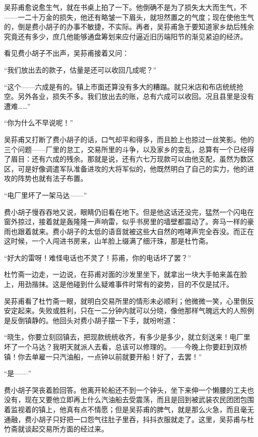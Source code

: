 \par 吴荪甫愈说愈生气，就在书桌上拍了一下。他倒确不是为了损失太大而生气，不——一二十万金的损失，他还有略皱一下眉头，就坦然置之的气度；现在使他生气的，倒是费小胡子的办事不敏捷，不实际。再者，吴荪甫急于要知道家乡劫后残余究竟还有多少，庶几他能够通盘筹划来应付逼近旧历端阳节的渐见紧迫的经济。
\par 看见费小胡子不出声，吴荪甫接着又问：
\par “我们放出去的款子，估量是还可以收回几成呢？”
\par “这个——六成是有的。镇上市面还算没有多大的糟蹋。就只米店和布店统统抢空。另外各业，损失不多。我们放出去的账，总有六成可以收回。况且县里是没有遭难……”
\par “你为什么不早说呢！”
\par 吴荪甫又打断了费小胡子的话，口气却平和得多，而且脸上也掠过一丝笑影。他的三个问题——厂里的怠工，交易所里的斗争，以及家乡的变乱，总算有一个已经得了眉目：还有六成的残余。那就是说，还有六七万现款可以由他支配，虽然为数区区，可是好像调遣军队准备进攻的大将军似的，他既然明白了自己的实力，他的进攻的阵势也就有法子布置。
\par “电厂里坏了一架马达——”
\par 费小胡子慢吞吞地又说，眼睛仍旧看在地下。但是他这话还没完，猛然一个闪电在窗外掠过，接着就是轰隆隆一声响雷，似乎书房里的墙壁都震动了。奔马一样的豪雨也跟着就来。费小胡子的太低的语音就被这些大自然的咆哮声完全吞没。而正在这时候，一个人闯进书房来，山羊脸上缀满了细汗珠，那是杜竹斋。
\par “好大的雷呀！难怪电话也不灵了！荪甫，你的电话坏了罢？”
\par 杜竹斋一边走，一边说，在荪甫对面的沙发里坐下，就拿出一块大手帕来盖在脸上，用劲揩抹。这是他碰到什么疑难事件时常有的姿势，目的不仅是拭汗。
\par 吴荪甫看了杜竹斋一眼，就明白交易所里的情形未必顺利；他微微一笑，心里倒反安定起来。失败或胜利，只在一二分钟内就可以分晓，像他那样气魄远大的人照例是反倒镇静的。他回头对费小胡子摆一下手，就吩咐道：
\par “晓生，你要立刻回镇去，把现款统统收齐，有多少是多少，就立刻送来！电厂里坏了一个马达？我明天就派人去看，总该可以修理的。——今晚上你要赶到双桥镇！你去单雇一只汽油船，一点钟以前就要开船！好了，去罢！”
\par “是——”
\par 费小胡子哭丧着脸回答。他离开轮船还不到一个钟头，坐下来伸一个懒腰的工夫也没有，现在又要他立即再上什么汽油船去受震荡，而且是回到被武装农民团团包围着监视着的镇上，他真有点不情愿；但是吴荪甫的脾气，就是那么火急，而且毫无通融，费小胡子只好把一口怨气往肚子里吞，抖抖衣服就走了。这里，吴荪甫与杜竹斋就谈起交易所方面的经过来。
